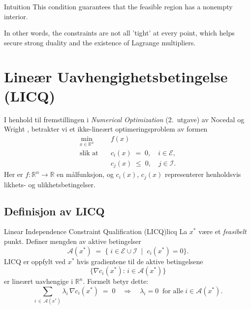 \begin{remark}{Intuition}{}
	This condition guarantees that the feasible region has a nonempty interior.

	In other words, the constraints are not all 'tight' at every point, which helps secure strong duality and the existence of Lagrange multipliers.
\end{remark}

\section{Lineær Uavhengighetsbetingelse (LICQ)}
\label{sec:LICQ}

I henhold til fremstillingen i \emph{Numerical Optimization} (2.~utgave) av Nocedal og Wright \cite[Kapittel~12]{NocedalWright}, betrakter vi et ikke-lineært optimeringsproblem av formen
\begin{equation}
	\label{eq:opt_problem}
	\begin{aligned}
		\min_{x \in \mathbb{R}^n}\quad & f(x)                                       \\
		\text{slik at}\quad
		                               & c_i(x) \;=\; 0, \quad i \in \mathcal{E},   \\[4pt]
		                               & c_j(x) \;\le\; 0, \quad j \in \mathcal{I}.
	\end{aligned}
\end{equation}
Her er \(f : \mathbb{R}^n \to \mathbb{R}\) en målfunksjon, og \(c_i(x)\), \(c_j(x)\) representerer henholdsvis likhets- og ulikhetsbetingelser.

\subsection{Definisjon av LICQ}

\begin{definition}{Linear Independence Constraint Qualification (LICQ)}{licq}
	La $x^*$ være et \emph{feasibelt} punkt. Definer mengden av aktive betingelser
	\[
		\mathcal{A}(x^*) \;=\; \{\; i \in \mathcal{E} \cup \mathcal{I} \;\mid\; c_i(x^*) = 0 \}.
	\]
	LICQ er oppfylt ved $x^*$ hvis gradientene til de aktive betingelsene
	\[
		\{\nabla c_i(x^*) :\, i \in \mathcal{A}(x^*)\}
	\]
	er lineært uavhengige i $\mathbb{R}^n$. Formelt betyr dette:
	\[
		\sum_{i \,\in\, \mathcal{A}(x^*)} \lambda_i \,\nabla c_i(x^*) \;=\; 0
		\quad \Longrightarrow \quad
		\lambda_i = 0 \;\;\text{for alle}\; i \in \mathcal{A}(x^*).
	\]
\end{definition}

